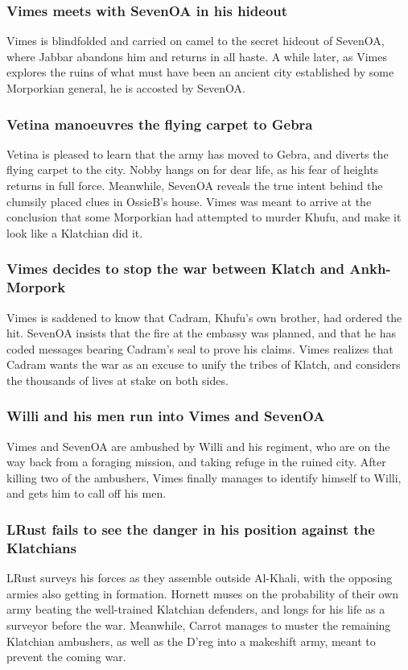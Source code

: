 \subsubsection{\Gls{Vimes} meets with \Gls{SevenOA} in his hideout}
\Gls{Vimes} is blindfolded and carried on camel to the secret hideout of \Gls{SevenOA}, where
\Gls{Jabbar} abandons him and returns in all haste. A while later, as \Gls{Vimes} explores the
ruins of what must have been an ancient city established by some Morporkian general, he is accosted
by \Gls{SevenOA}.

\subsubsection{\Gls{Vetina} manoeuvres the flying carpet to Gebra}
\Gls{Vetina} is pleased to learn that the army has moved to Gebra, and diverts the flying carpet to
the city. \Gls{Nobby} hangs on for dear life, as his fear of heights returns in full force.
Meanwhile, \Gls{SevenOA} reveals the true intent behind the clumsily placed clues in \Gls{OssieB}'s
house. \Gls{Vimes} was meant to arrive at the conclusion that some Morporkian had attempted to
murder \Gls{Khufu}, and make it look like a Klatchian did it.

\subsubsection{\Gls{Vimes} decides to stop the war between Klatch and Ankh-Morpork}
\Gls{Vimes} is saddened to know that \Gls{Cadram}, \Gls{Khufu}'s own brother, had ordered the hit.
\Gls{SevenOA} insists that the fire at the embassy was planned, and that he has coded messages
bearing \Gls{Cadram}'s seal to prove his claims. \Gls{Vimes} realizes that \Gls{Cadram} wants the
war as an excuse to unify the tribes of Klatch, and considers the thousands of lives at stake on
both sides.

\subsubsection{\Gls{Willi} and his men run into \Gls{Vimes} and \Gls{SevenOA}}
\Gls{Vimes} and \Gls{SevenOA} are ambushed by \Gls{Willi} and his regiment, who are on the way back
from a foraging mission, and taking refuge in the ruined city. After killing two of the ambushers,
\Gls{Vimes} finally manages to identify himself to \Gls{Willi}, and gets him to call off his men.

\subsubsection{\Gls{LRust} fails to see the danger in his position against the Klatchians}
\Gls{LRust} surveys his forces as they assemble outside Al-Khali, with the opposing armies also
getting in formation. \Gls{Hornett} muses on the probability of their own army beating the
well-trained Klatchian defenders, and longs for his life as a surveyor before the war. Meanwhile,
\Gls{Carrot} manages to muster the remaining Klatchian ambushers, as well as the D'reg into a
makeshift army, meant to prevent the coming war.

